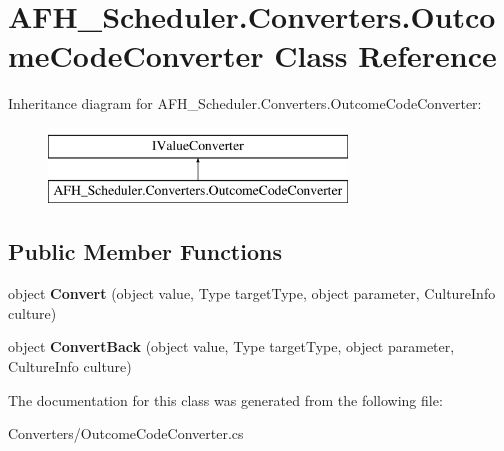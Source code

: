 \section{A\+F\+H\+\_\+\+Scheduler.\+Converters.\+Outcome\+Code\+Converter Class Reference}
\label{class_a_f_h___scheduler_1_1_converters_1_1_outcome_code_converter}
Inheritance diagram for A\+F\+H\+\_\+\+Scheduler.\+Converters.\+Outcome\+Code\+Converter\+:\begin{figure}[H]
\begin{center}
\leavevmode
\includegraphics[height=2.000000cm]{class_a_f_h___scheduler_1_1_converters_1_1_outcome_code_converter}
\end{center}
\end{figure}
\subsection*{Public Member Functions}
\begin{DoxyCompactItemize}
\item 
\mbox{\label{class_a_f_h___scheduler_1_1_converters_1_1_outcome_code_converter_ab28938bfbb2edeb5e5f8438b60ff04e9}} 
object {\bfseries Convert} (object value, Type target\+Type, object parameter, Culture\+Info culture)
\item 
\mbox{\label{class_a_f_h___scheduler_1_1_converters_1_1_outcome_code_converter_ac28a60e5ec81eb0bcc3f4bb56401fa46}} 
object {\bfseries Convert\+Back} (object value, Type target\+Type, object parameter, Culture\+Info culture)
\end{DoxyCompactItemize}


The documentation for this class was generated from the following file\+:\begin{DoxyCompactItemize}
\item 
Converters/Outcome\+Code\+Converter.\+cs\end{DoxyCompactItemize}
